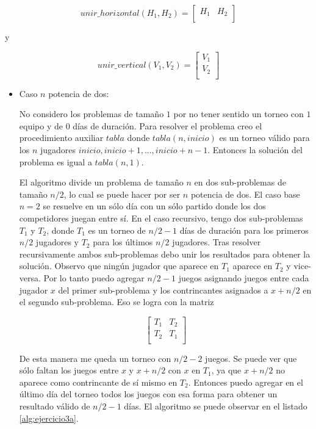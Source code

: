 \documentclass{article}
\begin{document}
$$
unir\_horizontal(H_1, H_2) = \left[
\begin{array}{cc}
H_1 & H_2 \\
\end{array}
\right]
$$

y

$$
unir\_vertical(V_1, V_2) = \left[
\begin{array}{c}
V_1 \\
V_2 \\
\end{array}
\right]
$$

\begin{itemize}

\item Caso $n$ potencia de dos:

No considero los problemas de tamaño $1$ por no tener sentido un torneo con $1$ equipo y de $0$
días de duración. Para resolver el problema creo el procedimiento auxiliar $tabla$ donde
$tabla(n, inicio)$ es un torneo válido para los $n$ jugadores $inicio, inicio+1, ..., inicio+n-1$.
Entonces la solución del problema es igual a $tabla(n, 1)$.

El algoritmo divide un problema de tamaño $n$ en dos sub-problemas
de tamaño $n/2$, lo cual se puede hacer por ser $n$ potencia de dos. El caso base $n = 2$
se resuelve en un sólo día con un sólo partido donde los dos competidores juegan entre sí.
En el caso recursivo, tengo dos sub-problemas $T_1$ y $T_2$, donde $T_1$ es un torneo de $n/2-1$ días
de duración para los primeros $n/2$ jugadores y $T_2$ para los últimos $n/2$ jugadores. Tras resolver
recursivamente ambos sub-problemas debo unir los resultados para obtener la solución. Observo que ningún
jugador que aparece en $T_1$ aparece en $T_2$ y vice-versa. Por lo tanto puedo agregar $n/2-1$ juegos
asignando juegos entre cada jugador $x$ del primer sub-problema y los contrincantes asignados a $x+n/2$
en el segundo sub-problema. Eso se logra con la matriz

$$
\left[
\begin{array}{cc}
T_1 & T_2 \\
T_2 & T_1 \\
\end{array}
\right]
$$

De esta manera me queda un torneo con $n/2-2$ juegos. Se puede ver que sólo faltan los juegos
entre $x$ y $x+n/2$ con $x$ en $T_1$, ya que $x+n/2$ no aparece como contrincante de sí mismo
en $T_2$. Entonces puedo agregar en el último día del torneo todos los juegos con esa forma para
obtener un resultado válido de $n/2-1$ días. El algoritmo se puede observar en el listado
\ref{alg:ejercicio3a}.


\end{itemize}
\end{document}
